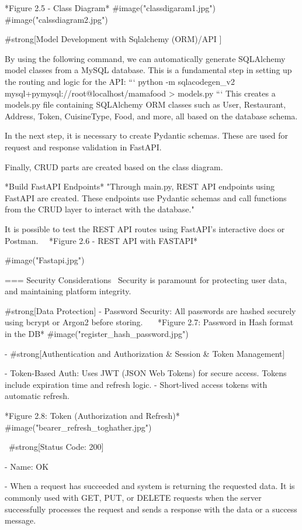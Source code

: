*Figure 2.5 - Class Diagram*
#image("classdigaram1.jpg")
#image("calssdiagram2.jpg")
\
\

#strong[Model Development with Sqlalchemy (ORM)/API ]

By using the following command, we can automatically generate SQLAlchemy model classes from a MySQL database. This is a fundamental step in setting up the routing and logic for the API:
```
python -m sqlacodegen_v2 mysql+pymysql://root@localhost/mamafood > models.py
```
This creates a models.py file containing SQLAlchemy ORM classes such as User, Restaurant, Address, Token, CuisineType, Food, and more, all based on the database schema.

In the next step, it is necessary to create Pydantic schemas. These are used for request and response validation in FastAPI.

Finally, CRUD parts are created based on the class diagram.


*Build FastAPI Endpoints*
"Through main.py, REST API endpoints using FastAPI are created. These endpoints use Pydantic schemas and call functions from the CRUD layer to interact with the database."

It is possible to test the REST API routes using FastAPI’s interactive docs or Postman.
\
\
*Figure 2.6 - REST API with FASTAPI*

#image("Fastapi.jpg")

=== Security Considerations
\
Security is paramount for protecting user data, and maintaining platform integrity.

#strong[Data Protection]
- Password Security: All passwords are hashed securely using bcrypt or Argon2 before storing.
\
\
\
*Figure 2.7: Password in Hash format in the DB*
#image("register_hash_password.jpg")

- #strong[Authentication and Authorization & Session & Token Management]

    - Token-Based Auth: Uses JWT (JSON Web Tokens) for secure access. Tokens include expiration time and refresh logic.
    - Short-lived access tokens with automatic refresh.
\

*Figure 2.8: Token (Authorization and Refresh)*
#image("bearer_refresh_toghather.jpg")

\
#strong[Status Code: 200]

- Name: OK

- When a request has succeeded and system is returning the requested data. It is commonly used with GET, PUT, or DELETE requests when the server successfully processes the request and sends a response with the data or a success message.

